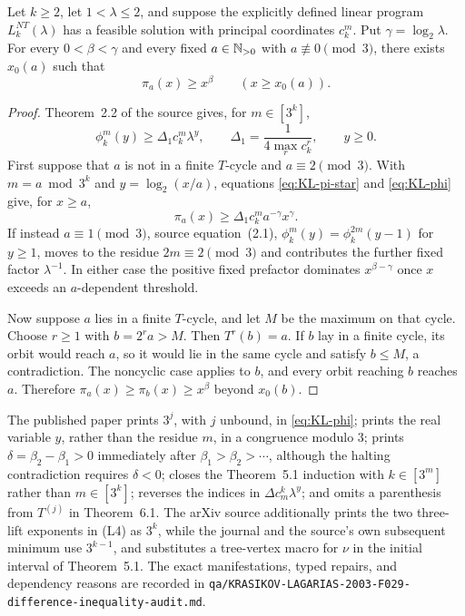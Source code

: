 \begin{proposition}
\label{prop:KL-target-handoff}
Let \(k\ge2\), let \(1<\lambda\le2\), and suppose the explicitly defined
linear program \(L_k^{NT}(\lambda)\) has a feasible solution with principal
coordinates \(c_k^m\).  Put \(\gamma=\log_2\lambda\).  For every
\(0<\beta<\gamma\) and every fixed \(a\in\mathbb{N}_{>0}\) with
\(a\not\equiv0\pmod3\), there exists \(x_0(a)\) such that
\[
 \pi_a(x)\ge x^\beta\qquad(x\ge x_0(a)).
\]
\end{proposition}

\begin{proof}
Theorem~2.2 of the source gives, for \(m\in[3^k]\),
\[
 \phi_k^m(y)\ge
 \Delta_1c_k^m\lambda^y,\qquad
 \Delta_1=\frac{1}{4\max_r c_k^r},\qquad y\ge0.
\]
First suppose that \(a\) is not in a finite \(T\)-cycle and
\(a\equiv2\pmod3\).  With \(m=a\bmod3^k\) and
\(y=\log_2(x/a)\), equations \eqref{eq:KL-pi-star} and
\eqref{eq:KL-phi} give, for \(x\ge a\),
\[
 \pi_a(x)\ge\Delta_1c_k^m a^{-\gamma}x^\gamma.
\]
If instead \(a\equiv1\pmod3\), source equation~(2.1),
\(\phi_k^m(y)=\phi_k^{2m}(y-1)\) for \(y\ge1\), moves to the residue
\(2m\equiv2\pmod3\) and contributes the further fixed factor
\(\lambda^{-1}\).  In either case the positive fixed prefactor dominates
\(x^{\beta-\gamma}\) once \(x\) exceeds an \(a\)-dependent threshold.

Now suppose \(a\) lies in a finite \(T\)-cycle, and let \(M\) be the maximum
on that cycle.  Choose \(r\ge1\) with \(b=2^ra>M\).  Then \(T^r(b)=a\).
If \(b\) lay in a finite cycle, its orbit would reach \(a\), so it would lie
in the same cycle and satisfy \(b\le M\), a contradiction.  The noncyclic
case applies to \(b\), and every orbit reaching \(b\) reaches \(a\).
Therefore \(\pi_a(x)\ge\pi_b(x)\ge x^\beta\) beyond \(x_0(b)\).
\end{proof}

\begin{sourceissue}
\label{sourceissue:KL-2003-defects}
The published paper prints \(3^j\), with \(j\) unbound, in
\eqref{eq:KL-phi}; prints the real variable \(y\), rather than the residue
\(m\), in a congruence modulo \(3\); prints
\(\delta=\beta_2-\beta_1>0\) immediately after
\(\beta_1>\beta_2>\cdots\), although the halting contradiction requires
\(\delta<0\); closes the Theorem~5.1 induction with
\(k\in[3^m]\) rather than \(m\in[3^k]\); reverses the indices in
\(\Delta c_m^k\lambda^y\); and omits a parenthesis from \(T^{(j)}\) in
Theorem~6.1.  The arXiv source additionally prints the two three-lift
exponents in (L4) as \(3^k\), while the journal and the source's own
subsequent minimum use \(3^{k-1}\), and substitutes a tree-vertex macro for
\(\nu\) in the initial interval of Theorem~5.1.  The exact manifestations,
typed repairs, and dependency reasons are recorded in
\texttt{qa/KRASIKOV-LAGARIAS-2003-F029-difference-inequality-audit.md}.
\end{sourceissue}

